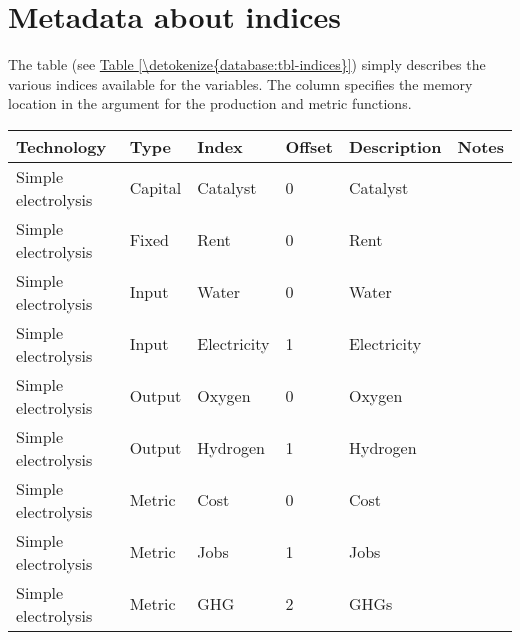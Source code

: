 \documentclass[letterpaper,10pt,english]{sphinxmanual}
\begin{document}
\section{Metadata about indices}
\label{\detokenize{database:metadata-about-indices}}
The  table (see \hyperref[\detokenize{database:tbl-indices}]{Table \ref{\detokenize{database:tbl-indices}}}) simply describes the various
indices available for the variables. The  column specifies the
memory location in the argument for the production and metric functions.


\begin{savenotes}\sphinxattablestart
\centering
{}
\sphinxthecaptionisattop
{}\label{\detokenize{database:table-1}}\label{\detokenize{database:tbl-indices}}
\sphinxaftertopcaption
\begin{tabulary}{\linewidth}[t]{|T|T|T|T|T|T|}
\hline
\sphinxstyletheadfamily 
Technology
&\sphinxstyletheadfamily 
Type
&\sphinxstyletheadfamily 
Index
&\sphinxstyletheadfamily 
Offset
&\sphinxstyletheadfamily 
Description
&\sphinxstyletheadfamily 
Notes
\\
\hline
Simple electrolysis
&
Capital
&
Catalyst
&
0
&
Catalyst
&\\
\hline
Simple electrolysis
&
Fixed
&
Rent
&
0
&
Rent
&\\
\hline
Simple electrolysis
&
Input
&
Water
&
0
&
Water
&\\
\hline
Simple electrolysis
&
Input
&
Electricity
&
1
&
Electricity
&\\
\hline
Simple electrolysis
&
Output
&
Oxygen
&
0
&
Oxygen
&\\
\hline
Simple electrolysis
&
Output
&
Hydrogen
&
1
&
Hydrogen
&\\
\hline
Simple electrolysis
&
Metric
&
Cost
&
0
&
Cost
&\\
\hline
Simple electrolysis
&
Metric
&
Jobs
&
1
&
Jobs
&\\
\hline
Simple electrolysis
&
Metric
&
GHG
&
2
&
GHGs
&\\
\hline
\end{tabulary}
\par
\sphinxattableend\end{savenotes}
\end{document}
